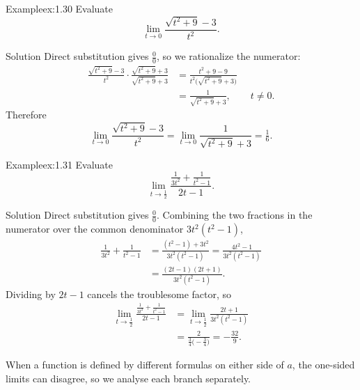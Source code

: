 \documentclass[a4paper,12pt,oneside]{memoir}
\begin{document}
\begin{workedexample}
\begin{envexample}{Example}{ex:1.30}{}
Evaluate \[ \lim_{t \to 0} \frac{\sqrt{t^{2} + 9} - 3}{t^{2}}. \]
\end{envexample}
\begin{envsolution}{Solution}{}{}
Direct substitution gives \(\tfrac{0}{0}\), so we rationalize the numerator: \[ \begin{aligned} \frac{\sqrt{t^{2} + 9} - 3}{t^{2}} \cdot \frac{\sqrt{t^{2} + 9} + 3}{\sqrt{t^{2} + 9} + 3} &= \frac{t^{2} + 9 - 9}{t^{2}\bigl(\sqrt{t^{2} + 9} + 3\bigr)}\\ &= \frac{1}{\sqrt{t^{2} + 9} + 3}, \qquad t \neq 0. \end{aligned} \] Therefore \[ \lim_{t \to 0} \frac{\sqrt{t^{2} + 9} - 3}{t^{2}} = \lim_{t \to 0} \frac{1}{\sqrt{t^{2} + 9} + 3} = \tfrac{1}{6}. \]
\end{envsolution}
\end{workedexample}
\begin{workedexample}
\begin{envexample}{Example}{ex:1.31}{}
Evaluate \[ \lim_{t \to \frac{1}{2}} \frac{\frac{1}{3t^{2}} + \frac{1}{t^{2} - 1}}{2t - 1}. \]
\end{envexample}
\begin{envsolution}{Solution}{}{}
Direct substitution gives \(\tfrac{0}{0}\). Combining the two fractions in the numerator over the common denominator \(3t^{2}(t^{2} - 1)\), \[ \begin{aligned} \frac{1}{3t^{2}} + \frac{1}{t^{2} - 1} &= \frac{(t^{2} - 1) + 3t^{2}}{3t^{2}(t^{2} - 1)} = \frac{4t^{2} - 1}{3t^{2}(t^{2} - 1)} \\ &= \frac{(2t - 1)(2t + 1)}{3t^{2}(t^{2} - 1)}. \end{aligned} \] Dividing by \(2t - 1\) cancels the troublesome factor, so \[ \begin{aligned} \lim_{t \to \frac{1}{2}} \frac{\frac{1}{3t^{2}} + \frac{1}{t^{2} - 1}}{2t - 1} &= \lim_{t \to \frac{1}{2}} \frac{2t + 1}{3t^{2}(t^{2} - 1)} \\ &= \frac{2}{\tfrac{3}{4}\bigl(-\tfrac{3}{4}\bigr)} = -\frac{32}{9}. \end{aligned} \]
\end{envsolution}
\end{workedexample}
When a function is defined by different formulas on either side of \(a\), the one-sided limits can disagree, so we analyse each branch separately.
\end{document}
